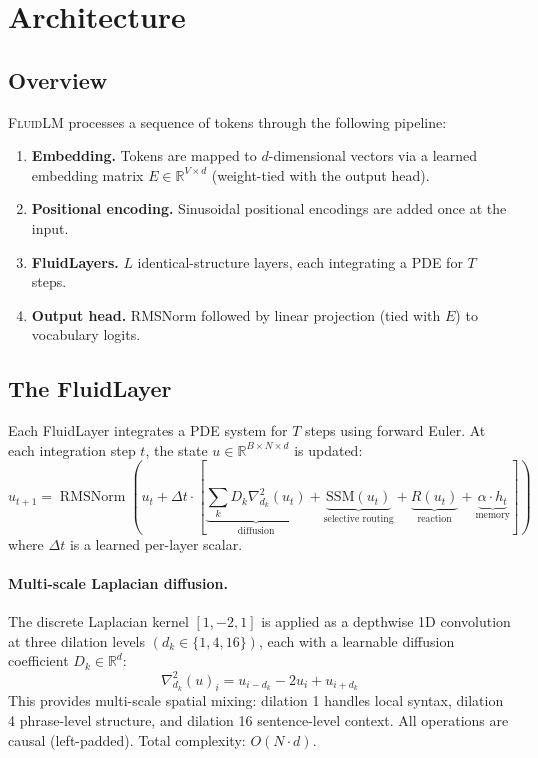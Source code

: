 \documentclass{article}
\newcommand{\R}{\mathbb{R}}
\newcommand{\fluidlm}{\textsc{FluidLM}}
\DeclareMathOperator{\rmsnorm}{RMSNorm}
\begin{document}
\section{Architecture}
\label{sec:architecture}

\subsection{Overview}

\fluidlm{} processes a sequence of tokens through the following pipeline:

\begin{enumerate}
    \item \textbf{Embedding.} Tokens are mapped to $d$-dimensional vectors via a learned embedding matrix $E \in \R^{V \times d}$ (weight-tied with the output head).
    \item \textbf{Positional encoding.} Sinusoidal positional encodings are added once at the input.
    \item \textbf{FluidLayers.} $L$ identical-structure layers, each integrating a PDE for $T$ steps.
    \item \textbf{Output head.} RMSNorm followed by linear projection (tied with $E$) to vocabulary logits.
\end{enumerate}

\subsection{The FluidLayer}

Each FluidLayer integrates a PDE system for $T$ steps using forward Euler. At each integration step $t$, the state $u \in \R^{B \times N \times d}$ is updated:
\begin{equation}
\label{eq:pde}
u_{t+1} = \rmsnorm\!\left( u_t + \Delta t \cdot \left[ \underbrace{\sum_{k} D_k \nabla^2_{d_k}(u_t)}_{\text{diffusion}} + \underbrace{\text{SSM}(u_t)}_{\text{selective routing}} + \underbrace{R(u_t)}_{\text{reaction}} + \underbrace{\alpha \cdot h_t}_{\text{memory}} \right] \right)
\end{equation}
where $\Delta t$ is a learned per-layer scalar.

\paragraph{Multi-scale Laplacian diffusion.}
The discrete Laplacian kernel $[1, -2, 1]$ is applied as a depthwise 1D convolution at three dilation levels $(d_k \in \{1, 4, 16\})$, each with a learnable diffusion coefficient $D_k \in \R^d$:
\begin{equation}
\nabla^2_{d_k}(u)_i = u_{i-d_k} - 2u_i + u_{i+d_k}
\end{equation}
This provides multi-scale spatial mixing: dilation 1 handles local syntax, dilation 4 phrase-level structure, and dilation 16 sentence-level context. All operations are causal (left-padded). Total complexity: $O(N \cdot d)$.
\end{document}
